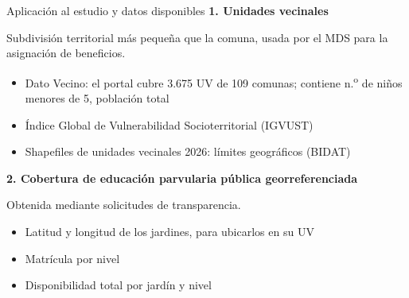 \documentclass[aspectratio=169,10pt]{beamer}
\begin{document}
\begin{frame}{Aplicación al estudio y datos disponibles}
  \footnotesize
  \textbf{1. Unidades vecinales}\par
  {\color{graytext} Subdivisión territorial más pequeña que la comuna, usada por el MDS para la asignación de beneficios.\par}
  \begin{itemize}[itemsep=2pt,topsep=1pt]
    \item Dato Vecino: el portal cubre 3.675 UV de 109 comunas; contiene n.\textsuperscript{o} de niños menores de 5, población total
    \item Índice Global de Vulnerabilidad Socioterritorial (IGVUST)
    \item Shapefiles de unidades vecinales 2026: límites geográficos (BIDAT)
  \end{itemize}
  \vspace{3pt}
  \textbf{2. Cobertura de educación parvularia pública georreferenciada}\par
  {\color{graytext} Obtenida mediante solicitudes de transparencia.\par}
  \begin{itemize}[itemsep=2pt,topsep=1pt]
    \item Latitud y longitud de los jardines, para ubicarlos en su UV
    \item Matrícula por nivel
    \item Disponibilidad total por jardín y nivel
  \end{itemize}
\end{frame}
\end{document}
